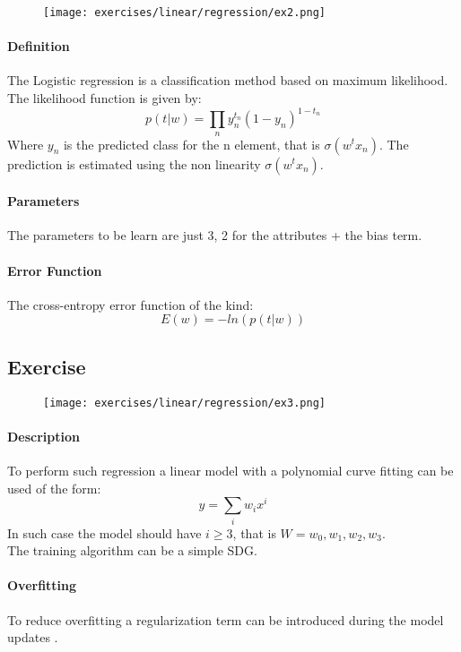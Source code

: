 \begin{figure}[H]
    \centering
    \texttt{[image: exercises/linear/regression/ex2.png]}
\end{figure}
 
 \paragraph{Definition}
The Logistic regression is a classification method based on maximum likelihood.
The likelihood function is given by:
$$p(t|w)=\prod_n y_n^{t_n}(1-y_n)^{1-t_n}$$
Where $y_n$ is the predicted class for the n element, that is $\sigma(w^tx_n)$. The prediction is estimated using the non linearity $\sigma(w^tx_n)$.

\paragraph{Parameters}
The parameters to be learn are just 3, 2 for the attributes + the bias term.

\paragraph{Error Function}
The cross-entropy error function of the kind:
$$E(w)=-ln(p(t|w))$$

\subsection{Exercise }

\begin{figure}[H]
    \centering
    \texttt{[image: exercises/linear/regression/ex3.png]}
\end{figure}

\paragraph{Description}
To perform such regression a linear model with a polynomial curve fitting can be used of the form:
$$y=\sum_i w_ix^i$$
In such case the model should have $i \ge 3$, that is $W=w_0,w_1,w_2,w_3$.\\
The training algorithm can be a simple SDG.

\paragraph{Overfitting}
To reduce overfitting a regularization term can be introduced during the model updates .


